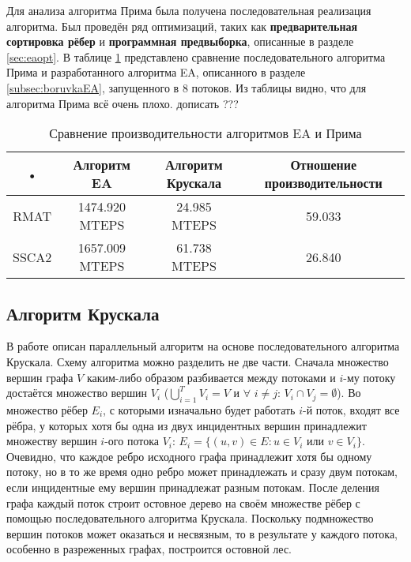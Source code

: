 \documentclass[a4paper,12pt]{extarticle}
\begin{document}
Для анализа алгоритма Прима была получена последовательная реализация алгоритма.
Был проведён ряд оптимизаций, таких как \textbf{предварительная сортировка рёбер} и \textbf{программная предвыборка}, описанные в разделе \ref{sec:eaopt}.
В таблице \ref{tabel:primaSeq} представлено сравнение последовательного алгоритма Прима и разработанного алгоритма EA, описанного в разделе \ref{subsec:boruvkaEA}, запущенного в 8 потоков.
Из таблицы видно, что для алгоритма Прима всё очень плохо. дописать ???

\begin{table}
    \caption{Сравнение производительности алгоритмов EA и Прима}
    \label{tabel:primaSeq}
    \begin{center}
        \begin{tabular}{|c|c|c|c|}
            \hline 
            \rule[-1ex]{0pt}{2.5ex} • & Алгоритм EA & Алгоритм Крускала & Отношение производительности \\ 
            \hline 
            \rule[-1ex]{0pt}{2.5ex} RMAT & 1474.920 MTEPS & 24.985 MTEPS & 59.033 \\ 
            \hline 
            \rule[-1ex]{0pt}{2.5ex} SSCA2 & 1657.009 MTEPS & 61.738 MTEPS & 26.840 \\ 
            \hline 
        \end{tabular}
    \end{center}
\end{table} 

\subsection{Алгоритм Крускала}
\label{subsec:algoKruskal}

В работе \cite{kruskal-parallel} описан параллельный алгоритм на основе последовательного алгоритма Крускала.
Схему алгоритма можно разделить не две части.
Сначала множество вершин графа $V$ каким-либо образом разбивается между потоками и $i$-му потоку достаётся множество вершин $V_i$ ($ \displaystyle \bigcup_{i=1}^T V_i = V $ и $\forall$ $i \neq j$: $V_i \cap V_j = \emptyset$). 
Во множество рёбер $E_i$, с которыми изначально будет работать $i$-й поток, входят все рёбра, у которых хотя бы одна из двух инцидентных вершин принадлежит множеству вершин $i$-ого потока $V_i$: 
$E_i = \{ (u, v) \in E : u \in V_i$ или $v \in V_i \}$.
Очевидно, что каждое ребро исходного графа принадлежит хотя бы одному потоку, но в то же время одно ребро может принадлежать и сразу двум потокам, если инцидентные ему вершин принадлежат разным потокам.
После деления графа каждый поток строит остовное дерево на своём множестве рёбер с помощью последовательного алгоритма Крускала. 
Поскольку подмножество вершин потоков может оказаться и несвязным, то в результате у каждого потока, особенно в разреженных графах, построится остовной лес.
\end{document}
